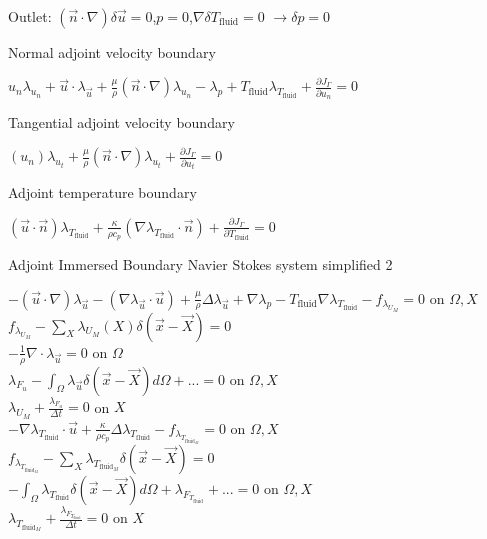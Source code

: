\documentclass[10pt]{article} %
\begin{document}
\begin{center}
\begin{flushleft}
	Outlet: $\left(\vec{n}\cdot \nabla \right)\delta \vec{u} = 0$,$p=0$,$\nabla \delta T_{\text{fluid}} = 0$ $\rightarrow \delta p=0$\\
\end{flushleft}
\begin{flushleft}
	\quad \quad Normal adjoint velocity boundary
\end{flushleft}
	$u_n \lambda_{u_n} + \vec{u}\cdot \lambda_{\vec{u}} + \frac{\mu}{\rho} \left(\vec{n} \cdot \nabla\right) \lambda_{u_n} -\lambda_p + T_{\text{fluid}} \lambda_{T_{\text{fluid}}} + \frac{\partial J_{\Gamma}}{\partial u_n} = 0$\\
\begin{flushleft}
	\quad \quad Tangential adjoint velocity boundary
\end{flushleft}	
	$\left(u_n\right) \lambda_{u_t} + \frac{\mu}{\rho} \left(\vec{n} \cdot \nabla\right) \lambda_{u_t} + \frac{\partial J_{\Gamma}}{\partial u_t} = 0$\\
\begin{flushleft}
	\quad \quad Adjoint temperature boundary
\end{flushleft}
	$\left(\vec{u}\cdot \vec{n}\right) \lambda_{T_{\text{fluid}}}  + \frac{\kappa}{\rho c_p} \left(\nabla \lambda_{T_{\text{fluid}}} \cdot \vec{n}\right) + \frac{\partial J_{\Gamma}}{\partial T_{\text{fluid}}}=0 $\\
\begin{flushleft}
	\newpage
	Adjoint Immersed Boundary Navier Stokes system simplified 2
\end{flushleft}
	$-(\vec{u}\cdot\nabla) \lambda_{\vec{u}} - \left(\nabla \lambda_{\vec{u}} \cdot \vec{u}\right) + \frac{\mu}{\rho} \Delta \lambda_{\vec{u}} + \nabla\lambda_p - T_{\text{fluid}} \nabla \lambda_{T_{\text{fluid}}} - f_{\lambda_{U_M}} = 0$ \quad on $\Omega,X$\\
	$f_{\lambda_{U_M}} - \sum_X \lambda_{U_M}(X) \delta(\vec{x}-\vec{X}) = 0$\\
	$-\frac{1}{\rho} \nabla \cdot \lambda_{\vec{u}} = 0$ \quad on $\Omega$\\
	$\lambda_{F_u} - \int_{\Omega} \lambda_{\vec{u}} \delta (\vec{x}-\vec{X}) d\Omega + ... = 0$ \quad on $\Omega,X$\\
	$\lambda_{U_M} + \frac{\lambda_{F_u}}{\Delta t}=0$ \quad on $X$\\
	$-\nabla \lambda_{T_{\text{fluid}}} \cdot \vec{u} + \frac{\kappa}{\rho c_p} \Delta  \lambda_{T_{\text{fluid}}} - f_{\lambda_{T_{\text{fluid}_M}}} = 0$ \quad on $\Omega,X$\\
	$f_{\lambda_{T_{\text{fluid}_M}}} - \sum_{X} \lambda_{T_{\text{fluid}_M}} \delta (\vec{x}-\vec{X}) = 0$\\
	$-\int_{\Omega} \lambda_{T_{\text{fluid}}} \delta (\vec{x}-\vec{X}) d\Omega + \lambda_{F_{T_{\text{fluid}}}} + ... = 0$ \quad on $\Omega, X$\\
	$\lambda_{T_{\text{fluid}_M}} + \frac{\lambda_{F_{T_{\text{fluid}}}}}{\Delta t} =0$ \quad on $X$
	

\end{center}
\end{document}
